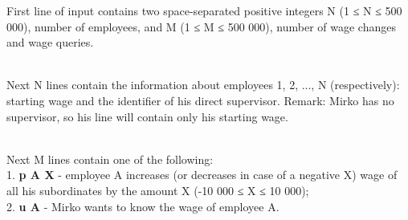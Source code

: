 First line of input contains two space-separated positive integers N (1 ≤ N ≤ 500 000), number of employees, and M (1 ≤ M ≤ 500 000), number of wage changes and wage queries.


\\Next N lines contain the information about employees 1, 2, ..., N (respectively): starting wage and the identifier of his direct supervisor. Remark: Mirko has no supervisor, so his line will contain only his starting wage.


\\Next M lines contain one of the following:
\\1. \textbf{ p A X } - employee A increases (or decreases in case of a negative X) wage of all his subordinates by the amount X (-10 000 ≤ X ≤ 10 000);
\\2. \textbf{ u A } - Mirko wants to know the wage of employee A.